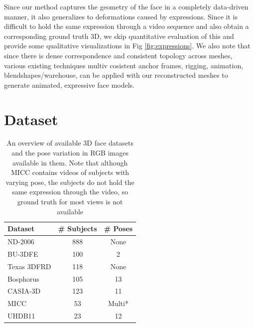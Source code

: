 \documentclass[10pt,twocolumn,letterpaper]{article}
\begin{document}
Since our method captures the geometry of the face in a completely data-driven manner, it also generalizes to deformations caused by expressions. 
Since it is difficult to hold the same expression through a video sequence and also obtain a corresponding ground truth 3D, we skip quantitative evaluation of this and provide some qualitative visualizations in Fig \ref{fig:expressions}. 
We also note that since there is dense correspondence and consistent topology across meshes, various existing techniques \cite{} multiv cosistent anchor frames, rigging, animation, blendshapes/warehouse, can be applied with our reconstructed meshes to generate animated, expressive face models.



\section{Dataset}
\begin{table}
\begin{center}
\begin{tabular}{|l|c| c|}
\hline
Dataset & \# Subjects & \# Poses \\
\hline\hline
ND-2006 & 888 & None \\
BU-3DFE & 100 & 2 \\
Texas 3DFRD & 118 & None\\
Bosphorus & 105 & 13\\
CASIA-3D & 123 & 11\\
MICC & 53 & Multi*\\
UHDB11 & 23 & 12\\
\hline
\end{tabular}
\end{center}
\caption{An overview of available 3D face datasets and the pose variation in RGB images available in them. Note that although MICC contains videos of subjects with varying pose, the subjects do not hold the same expression through the video, so ground truth for most views is not available}
\end{table}
\end{document}
